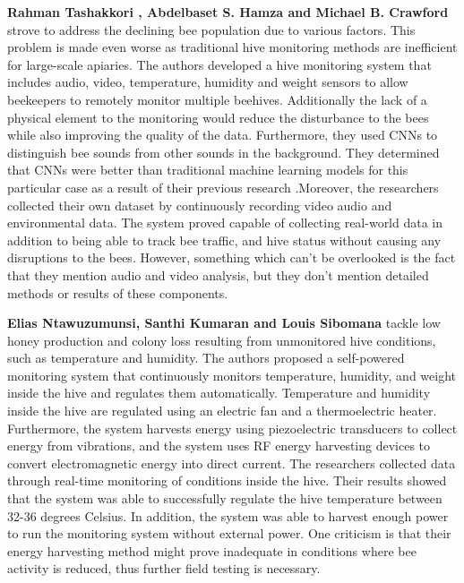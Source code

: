 \documentclass[12pt]{article}
\begin{document}
	\noindent \textbf{Rahman Tashakkori , Abdelbaset S. Hamza and Michael B. Crawford} \cite{tashakkori2021beemon} strove to address the declining bee population due to various factors. This problem is made even worse as traditional hive monitoring methods are inefficient for large-scale apiaries. The authors developed a hive monitoring system that includes audio, video, temperature, humidity and weight sensors  to allow beekeepers to remotely monitor multiple beehives. Additionally the lack of a physical element to the monitoring would reduce the disturbance to the bees while also improving the quality of the data. Furthermore, they used CNNs to distinguish bee sounds from other sounds in the background. They determined that CNNs were better than traditional machine learning models for this particular case as a result of their previous research .Moreover, the researchers collected their own dataset by continuously recording video audio and environmental data. The system proved capable of collecting real-world data in addition to being able to track bee traffic, and hive status without causing any disruptions to the bees. However, something which can't be overlooked is the fact that they mention audio and video analysis, but they don't mention detailed methods or results of these components. \\ \newline
	
	
	
	\noindent \textbf{Elias Ntawuzumunsi, Santhi Kumaran and Louis Sibomana} \cite{ntawuzumunsi2021self} tackle low honey production and colony loss resulting from unmonitored hive conditions, such as temperature and humidity. The authors proposed a self-powered monitoring system that continuously monitors temperature, humidity, and weight inside the hive and regulates them automatically. Temperature and humidity inside the hive are regulated using an electric fan and a thermoelectric heater. Furthermore, the system harvests energy using piezoelectric transducers to collect energy from vibrations, and the system uses RF energy harvesting devices to convert electromagnetic energy into direct current. The researchers collected data through real-time monitoring of conditions inside the hive. Their results showed that the system was able to successfully regulate the hive temperature between 32-36 degrees Celsius. In addition, the system was able to harvest enough power to run the monitoring system without external power. One criticism is that their energy harvesting method might prove inadequate in conditions where bee activity is reduced, thus further field testing is necessary.\\ \newline
	
\end{document}
